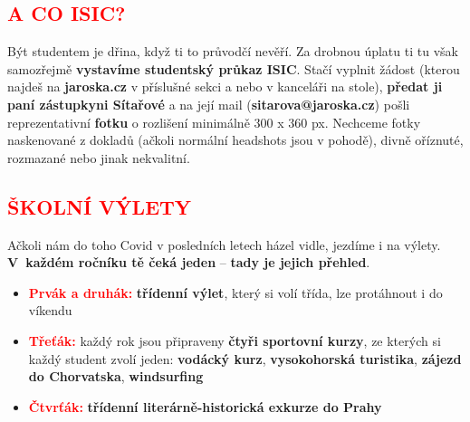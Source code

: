 \documentclass{article}
\newcommand{\podnadpis}[1]{
  \subsection*{\textcolor{red}{#1}}
}
\begin{document}
\podnadpis{A CO ISIC?}
Být studentem je dřina, když ti to průvodčí nevěří. Za drobnou úplatu ti tu však samozřejmě \textbf{vystavíme studentský průkaz ISIC}. Stačí vyplnit žádost (kterou najdeš na {\bf jaroska.cz} v příslušné sekci a nebo v kanceláři na stole), \textbf{předat ji paní zástupkyni Sítařové} a na její mail (\textbf{sitarova@jaroska.cz}) pošli reprezentativní \textbf{fotku} o rozlišení minimálně 300 x 360 px. Nechceme fotky naskenované z dokladů (ačkoli normální headshots jsou v pohodě), divně oříznuté, rozmazané nebo jinak
nekvalitní.

\newpage

\podnadpis{ŠKOLNÍ VÝLETY}
Ačkoli nám do toho Covid v posledních letech házel vidle, jezdíme i na výlety.
\textbf{V~každém ročníku tě čeká jeden} -- \textbf{tady je jejich přehled}.

\begin{itemize}[leftmargin=10pt]
  \item \textcolor{red}{\textbf{Prvák a druhák:}} \textbf{třídenní výlet}, který si volí třída, lze protáhnout i do víkendu
  \item \textcolor{red}{\textbf{Třeťák:}} každý rok jsou připraveny \textbf{čtyři sportovní kurzy}, ze kterých si každý student zvolí jeden: \textbf{vodácký kurz}, \textbf{vysokohorská turistika}, \textbf{zájezd do Chorvatska}, \textbf{windsurfing}
  \item \textcolor{red}{\textbf{Čtvrťák:}} \textbf{třídenní literárně-historická exkurze do Prahy}
\end{itemize}
\end{document}
